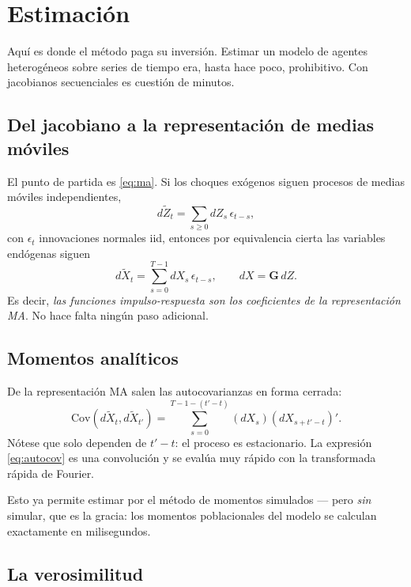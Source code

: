 \chapter{Estimación}
\label{cap:estimacion}

Aquí es donde el método paga su inversión. Estimar un modelo de agentes
heterogéneos sobre series de tiempo era, hasta hace poco, prohibitivo. Con
jacobianos secuenciales es cuestión de minutos.

\section{Del jacobiano a la representación de medias móviles}

El punto de partida es \eqref{eq:ma}. Si los choques exógenos siguen procesos de
medias móviles independientes,
\begin{equation}
d\tilde{Z}_t = \sum_{s\ge0} dZ_s\,\epsilon_{t-s},
\end{equation}
con $\epsilon_t$ innovaciones normales iid, entonces por equivalencia cierta las
variables endógenas siguen
\begin{equation}
d\tilde{X}_t = \sum_{s=0}^{T-1} dX_s\,\epsilon_{t-s},
\qquad dX = \mathbf{G}\,dZ.
\end{equation}
Es decir, \emph{las funciones impulso-respuesta son los coeficientes de la
representación MA}. No hace falta ningún paso adicional.

\section{Momentos analíticos}

De la representación MA salen las autocovarianzas en forma cerrada:
\begin{equation}
\mathrm{Cov}(d\tilde{X}_t, d\tilde{X}_{t'}) = \sum_{s=0}^{T-1-(t'-t)} (dX_s)(dX_{s+t'-t})'.
\label{eq:autocov}
\end{equation}
Nótese que solo dependen de $t'-t$: el proceso es estacionario. La expresión
\eqref{eq:autocov} es una convolución y se evalúa muy rápido con la transformada
rápida de Fourier.

Esto ya permite estimar por el método de momentos simulados --- pero \emph{sin}
simular, que es la gracia: los momentos poblacionales del modelo se calculan
exactamente en milisegundos.

\section{La verosimilitud}

